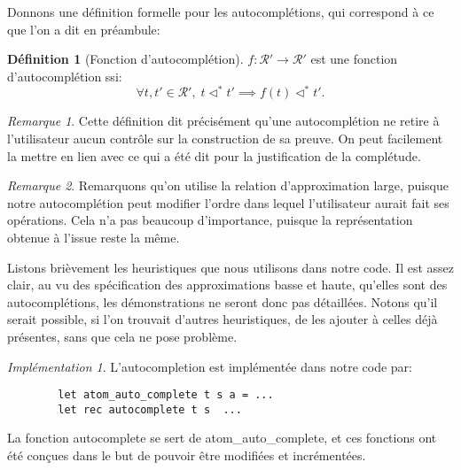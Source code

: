 \documentclass[11pt,a4paper]{article}
\theoremstyle{plain}
\theoremstyle{definition}
\newtheorem{definition}{Définition}
\theoremstyle{remark}
\newtheorem{remark}{Remarque}
\newtheorem{implementation}{Implémentation}
\newcommand*{\representationspartial}{\ensuremath{\mathcal{R'}}}
\newcommand*{\relapprox}{\ensuremath{\triangleleft}}
\newcommand*{\relapproxlarge}{\ensuremath{\relapprox^*}}
\begin{document}
Donnons une définition formelle pour les autocomplétions, qui correspond à ce que l'on a dit en préambule:

\begin{definition}[Fonction d'autocomplétion]
$f: \representationspartial \rightarrow \representationspartial$ est une fonction d'autocomplétion ssi:
\begin{equation*}
    \forall t, t' \in \representationspartial, \; t \relapproxlarge t' \implies f(t) \relapproxlarge t'.
\end{equation*}
\end{definition}

\begin{remark}
    Cette définition dit précisément qu'une autocomplétion ne retire à l'utilisateur aucun contrôle sur la construction de sa preuve. On peut facilement la mettre en lien avec ce qui a été dit pour la justification de la complétude. 
\end{remark}

\begin{remark}
    Remarquons qu'on utilise la relation d'approximation large, puisque notre autocomplétion peut modifier l'ordre dans lequel l'utilisateur aurait fait ses opérations. Cela n'a pas beaucoup d'importance, puisque la représentation obtenue à l'issue reste la même.
\end{remark}

Listons brièvement les heuristiques que nous utilisons dans notre code. Il est assez clair, au vu des spécification des approximations basse et haute, qu'elles sont des autocomplétions, les démonstrations ne seront donc pas détaillées. Notons qu'il serait possible, si l'on trouvait d'autres heuristiques, de les ajouter à celles déjà présentes, sans que cela ne pose problème.

\begin{implementation}
    L'autocompletion est implémentée dans notre code par:

    \begin{verbatim}
        let atom_auto_complete t s a = ...
        let rec autocomplete t s  ...
    \end{verbatim}
    
    La fonction autocomplete se sert de atom\_auto\_complete, et ces fonctions ont été conçues dans le but de pouvoir être modifiées et incrémentées.
\end{implementation}
\end{document}
